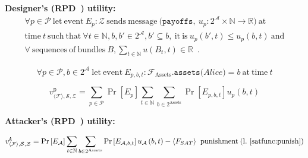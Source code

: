 \noindent \textbf{Designer's (RPD~\cite{rationalprotocol}) utility:}
\begin{gather*}
  \forall p \in \mathcal{P} \: \mathrm{let \: event} \: E_p: \mathcal{Z} \: \mathrm{sends
  \: message} \: \mathtt{(payoffs,} \: u_p:2^{\mathcal{A}} \times \mathbb{N} \rightarrow
  \mathbb{R} \mathtt{)} \: \mathrm{at} \\
  \mathrm{time} \: t \: \mathrm{such \: that} \: \forall t \in \mathbb{N}, b, b' \in
  2^{\mathcal{A}}, b' \subseteq b, \: \mathrm{it \: is} \: u_p\left(b', t\right) \leq
  u_p\left(b, t\right) \: \mathrm{and} \\
  \forall \: \mathrm{sequences \: of \: bundles} \: B, \sum\limits_{t \in
  \mathbb{N}}u\left(B_t, t\right) \in \mathbb{R}\enspace.
\end{gather*}

\begin{equation*}
  \forall p \in \mathcal{P}, b \in 2^{\mathcal{A}} \: \mathrm{let \: event} \: E_{p, b,
  t}: \mathcal{F}_{\mathrm{Assets}}.\mathtt{assets(}Alice\mathtt{)} = b \: \mathrm{at \:
  time} \: t
\end{equation*}

\begin{equation*}
  v^{\mathtt{D}}_{\langle \mathcal{F} \rangle, \mathcal{S}, \mathcal{Z}} = \sum\limits_{p
  \in \mathcal{P}} \Pr\left[E_p\right] \sum\limits_{t \in \mathbb{N}} \sum\limits_{b \in
  2^{\mathrm{Assets}}} \Pr\left[E_{p, b, t}\right] u_p\left(b, t\right)
\end{equation*}

\noindent \textbf{Attacker's (RPD~\cite{rationalprotocol}) utility:}

\begin{equation*}
  v^{\mathtt{A}}_{\langle \mathcal{F} \rangle, \mathcal{S}, \mathcal{Z}} =
  \Pr\left[E_\mathcal{A}\right] \sum\limits_{t \in \mathbb{N}} \sum\limits_{b \in
  2^{\mathrm{Assets}}} \Pr\left[E_{\mathcal{A}, b, t}\right] u_{\mathcal{A}}\left(b,
  t\right) - \langle F_{SAT} \rangle \: \mathrm{~punishment \: (l.~\ref{satfunc:punish})}
\end{equation*}
